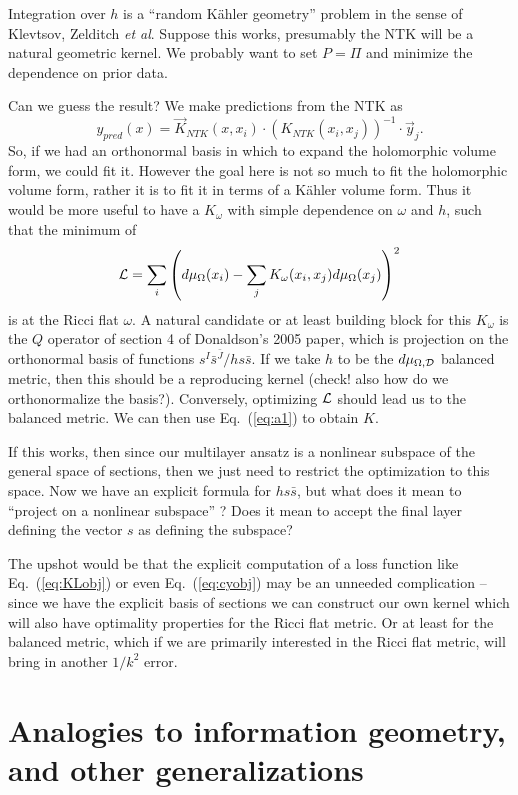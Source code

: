\documentclass[12pt]{article}
\def\CD {{\cal D}}
\def\CL {{\cal L}}
\newcommand{\eq}[1]{Eq.~(\ref{eq:#1})}
\newcommand{\be}{\begin{equation}}
\newcommand{\ee}{\end{equation}}
\def\bs{{\bar{s}}}
\def\bJ{{\bar{J}}}
\begin{document}
Integration over $h$ is a ``random K\"ahler geometry'' problem in the sense of Klevtsov, Zelditch {\it et al}.
Suppose this works, presumably the NTK will be a natural geometric kernel.  We probably want to set $P=\Pi$
and minimize the dependence on prior data.

Can we guess the result?  We make predictions from the NTK as
\be
y_{pred}(x) = \vec K_{NTK}(x,x_i) \cdot \left(K_{NTK}(x_i,x_j) \right)^{-1} \cdot \vec y_j .
\ee
So, if we had an orthonormal basis in which to expand the holomorphic volume form, we could fit it.
However the goal here is not so much to fit the holomorphic volume form, rather it is to fit it in terms of
a K\"ahler volume form.  Thus it would be more useful to have a $K_\omega$ with simple dependence
on $\omega$ and $h$, such that the minimum of
\be
\CL = \sum_{i} \left(d\mu_\Omega(x_i) - \sum_j K_\omega(x_i,x_j) d\mu_\Omega(x_j)\right)^2
\ee
is at the Ricci flat $\omega$.  A natural candidate or at least building block for
this $K_\omega$ is the $Q$ operator of section 4
of Donaldson's 2005 paper, which is projection on the orthonormal basis of functions $s^I \bs^\bJ/hs\bs$.
If we take $h$ to be the $d\mu_{\Omega,\CD}$ balanced metric, then this should be a reproducing 
kernel (check! also how do we orthonormalize the basis?).  
Conversely, optimizing $\CL$ should lead us to the balanced metric.
We can then use \eq{a1} to obtain $K$.

If this works, then since our multilayer ansatz is a nonlinear subspace of the general space of sections,
then we just need to restrict the optimization to this space.  Now we have an explicit formula for
$hs\bs$, but what does it mean to ``project on a nonlinear subspace'' ?  Does it mean to accept the
final layer defining the vector $s$ as defining the subspace?

The upshot would be that the explicit computation of a loss function like \eq{KLobj} or even \eq{cyobj} may be an
unneeded complication -- since we have the explicit basis of sections we can construct our own kernel
which will also have optimality properties for the Ricci flat metric.  Or at least for the balanced metric, which
if we are primarily interested in the Ricci flat metric, will bring in another $1/k^2$ error.


\section{ Analogies to information geometry, and other generalizations }
\end{document}
